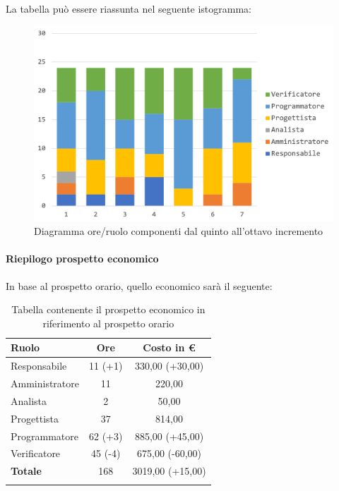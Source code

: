 		La tabella può essere riassunta nel seguente istogramma:
		\begin{figure}[H]
			\centering
			\includegraphics[width=0.8\linewidth]{./images/consuntivo/ConsIncr5-8-1.png}
			\caption{Diagramma ore/ruolo componenti dal quinto all'ottavo incremento}
			\label{fig:diagramma suddivione ruoli incrementi V-VIII}
		\end{figure}
		\pagebreak
		
		\paragraph{Riepilogo prospetto economico}
		In base al prospetto orario, quello economico sarà il seguente: 
		
		\begin{longtable}{|l|c|c|}
			\hline
			\rowcolor{lighter-grayer}
			\textbf{Ruolo} & \textbf{Ore} & \textbf{Costo in € } \\
			\hline
			\endfirsthead
			
			\hline
			Responsabile 	    & 11 (+1) & 330,00 (+30,00)\\
			\hline 
			\hline
			Amministratore	   & 11 & 220,00\\
			\hline
			\hline
			Analista 				& 2 & 50,00\\
			\hline
			\hline
			Progettista 		   & 37 & 814,00\\
			\hline
			\hline
			Programmatore 	  & 62 (+3) & 885,00 (+45,00)\\
			\hline
			\hline
			Verificatore 		   & 45 (-4) & 675,00 (-60,00)\\
			\hline
			\textbf{Totale} 	 & 168 & 3019,00 (+15,00)\\
			\hline
			\caption{Tabella contenente il prospetto economico in riferimento al prospetto orario}
		\end{longtable}
		
